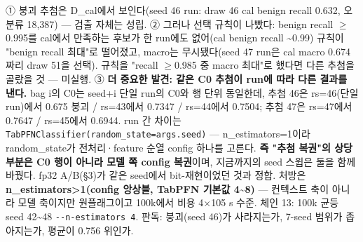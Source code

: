 ① 붕괴 추첨은 D\_\allowbreak{}cal에서 보인다(seed 46 run: draw 46 cal benign recall 0.632, 오분류 18,387) — 검출 자체는 성립. ② 그러나 선택 규칙이 나빴다: benign recall \ensuremath{\geq}0.995를 cal에서 만족하는 후보가 한 run에도 없어(cal benign recall \textasciitilde{}0.99) 규칙이 "benign recall 최대"로 떨어졌고, macro는 무시됐다(seed 47 run은 cal macro 0.674짜리 draw 51을 선택). 규칙을 "recall \ensuremath{\geq}0.985 중 macro 최대"로 했다면 다른 추첨을 골랐을 것 — 미실행. ③ \textbf{더 중요한 발견: 같은 C0 추첨이 run에 따라 다른 결과를 낸다.} bag i의 C0는 seed+\allowbreak{}i 단일 run의 C0와 행 단위 동일한데, 추첨 46은 rs=\allowbreak{}46(단일 run)에서 0.675 붕괴 /\allowbreak{} rs=\allowbreak{}43에서 0.7347 /\allowbreak{} rs=\allowbreak{}44에서 0.7504; 추첨 47은 rs=\allowbreak{}47에서 0.7647 /\allowbreak{} rs=\allowbreak{}45에서 0.6944. run 간 차이는 \texttt{TabPFNCl\allowbreak{}assifier\allowbreak{}(random\_\allowbreak{}\allowbreak{}state=\allowbreak{}\allowbreak{}ar\allowbreak{}gs.\allowbreak{}seed)\allowbreak{}} — n\_\allowbreak{}estimators=\allowbreak{}1이라 random\_\allowbreak{}state가 전처리·feature 순열 config 하나를 고른다. \textbf{즉 "추첨 복권"의 상당 부분은 C0 행이 아니라 모델 쪽 config 복권}이며, 지금까지의 seed 스윕은 둘을 함께 바꿨다. fp32 A/\allowbreak{}B(§3)가 같은 seed에서 bit-재현이었던 것과 정합. 처방은 \textbf{n\_\allowbreak{}estimators>1(config 앙상블, TabPFN 기본값 4\textasciitilde{}8)} — 컨텍스트 축이 아니라 모델 축이지만 원플래그이고 100k에서 비용 4×105 s 수준. 체인 13: 100k 균등 seed 42\textasciitilde{}48 \texttt{-\allowbreak{}-\allowbreak{}n-\allowbreak{}esti\allowbreak{}mators 4\allowbreak{}}. 판독: 붕괴(seed 46)가 사라지는가, 7-seed 범위가 좁아지는가, 평균이 0.756 위인가.

